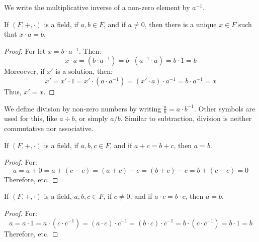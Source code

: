             We write the multiplicative inverse of a non-zero element
            by $a^{\minus{1}}$.
            \begin{theorem}
                If $(F,+,\cdot)$ is a field, if $a,b\in{F}$, and if
                $a\ne{0}$, then there is a unique $x\in{F}$ such that
                $x\cdot{a}=b$.
            \end{theorem}
            \begin{proof}
                For let $x=b\cdot{a}^{\minus{1}}$. Then:
                \begin{equation}
                    x\cdot{a}=(b\cdot{a}^{\minus{1}})=
                    b\cdot(a^{\minus{1}}\cdot{a})=
                    b\cdot{1}=b
                \end{equation}
                Moreoever, if $x'$ is a solution, then:
                \begin{equation}
                    x'=x'\cdot{1}=x'\cdot(a\cdot{a^{\minus{1}}})
                    =(x'\cdot{a})\cdot{a^{\minus{1}}}=
                    b\cdot{a}^{\minus{1}}=x
                \end{equation}
                Thus, $x'=x$.
            \end{proof}
            We define division by non-zero numbers by writing
            $\frac{a}{b}=a\cdot{b}^{\minus{1}}$. Other symbols are
            used for this, like $a\div{b}$, or simply $a/b$. Similar
            to subtraction, division is neither commutative nor
            associative.
            \begin{theorem}
                If $(F,+,\cdot)$ is a field, if $a,b,c\in{F}$, and if
                $a+c=b+c$, then $a=b$.
            \end{theorem}
            \begin{proof}
                For:
                \begin{equation}
                    a=a+0=a+(c-c)=(a+c)-c=(b+c)-c=b+(c-c)=0
                \end{equation}
                Therefore, etc.
            \end{proof}
            \begin{theorem}
                If $(F,+,\cdot)$ is a field, $a,b,c\in{F}$, if
                $c\ne{0}$, and if $a\cdot{c}=b\cdot{c}$, then
                $a=b$.
            \end{theorem}
            \begin{proof}
                For:
                \begin{equation}
                    a=a\cdot{1}=a\cdot(c\cdot{c}^{\minus{1}})=
                    (a\cdot{c})\cdot{c}^{\minus{1}}=
                    (b\cdot{c})\cdot{c}^{\minus{1}}=
                    b\cdot(c\cdot{c}^{\minus{1}})=
                    b\cdot{1}=b
                \end{equation}
                Therefore, etc.
            \end{proof}
